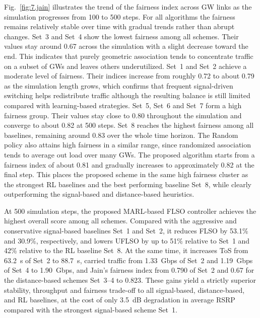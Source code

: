 Fig.~\ref{fig:7.jain} illustrates the trend of the fairness index across GW links as the simulation progresses from 100 to 500 steps. For all algorithms the fairness remains relatively stable over time with gradual trends rather than abrupt changes. Set~3 and Set~4 show the lowest fairness among all schemes. Their values stay around 0.67 across the simulation with a slight decrease toward the end. This indicates that purely geometric association tends to concentrate traffic on a subset of GWs and leaves others underutilized. Set~1 and Set~2 achieve a moderate level of fairness. Their indices increase from roughly 0.72 to about 0.79 as the simulation length grows, which confirms that frequent signal-driven switching helps redistribute traffic although the resulting balance is still limited compared with learning-based strategies. Set~5, Set~6 and Set~7 form a high fairness group. Their values stay close to 0.80 throughout the simulation and converge to about 0.82 at 500 steps. Set~8 reaches the highest fairness among all baselines, remaining around 0.83 over the whole time horizon. The Random policy also attains high fairness in a similar range, since randomized association tends to average out load over many GWs. The proposed algorithm starts from a fairness index of about 0.81 and gradually increases to approximately 0.82 at the final step. This places the proposed scheme in the same high fairness cluster as the strongest RL baselines and the best performing baseline Set~8, while clearly outperforming the signal-based and distance-based heuristics.

At 500 simulation steps, the proposed MARL-based FLSO controller achieves the highest overall score among all schemes.
Compared with the aggressive and conservative signal-based baselines Set~1 and Set~2, it reduces FLSO by 53.1\% and 30.9\%, respectively, and lowers UFLSO by up to 51\% relative to Set~1 and 42\% relative to the RL baseline Set~8.
At the same time, it increases ToS from 63.2~s of Set~2 to 88.7~s, carried traffic from 1.33~Gbps of Set~2 and 1.19~Gbps of Set~4 to 1.90~Gbps, and Jain's fairness index from 0.790 of Set~2 and 0.67 for the distance-based schemes Set~3--4 to 0.823.
These gains yield a strictly superior stability, throughput and fairness trade-off to all signal-based, distance-based, and RL baselines, at the cost of only 3.5~dB degradation in average RSRP compared with the strongest signal-based scheme Set~1.

